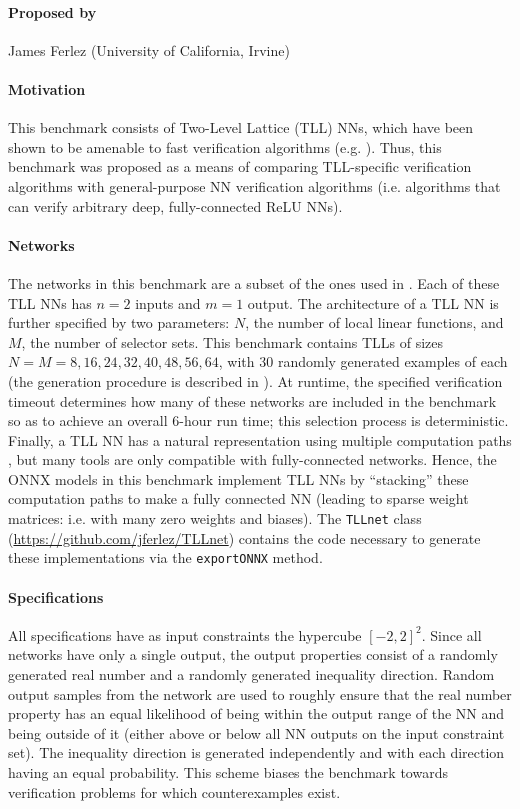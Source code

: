 \documentclass[oneside,11pt,dvipsnames]{book}
\begin{document}
\paragraph*{Proposed by} James Ferlez (University of California, Irvine)

\paragraph*{Motivation} This benchmark consists of Two-Level Lattice (TLL) NNs, which have been shown to be amenable to fast verification algorithms (e.g. \cite{FerlezKS22}). Thus, this benchmark was proposed as a means of comparing TLL-specific verification algorithms with general-purpose NN verification algorithms (i.e. algorithms that can verify arbitrary deep, fully-connected ReLU NNs).

\paragraph*{Networks}  The networks in this benchmark are a subset of the ones used in \cite[Experiment 3]{FerlezKS22}. Each of these TLL NNs has $n=2$ inputs and $m=1$ output. The architecture of a TLL NN is further specified by two parameters: $N$, the number of local linear functions, and $M$, the number of selector sets. This benchmark contains TLLs of sizes $N = M = 8, 16, 24, 32, 40, 48, 56, 64$, with $30$ randomly generated examples of each (the generation procedure is described in \cite[Section 6.1.1]{FerlezKS22}). At runtime, the specified verification timeout determines how many of these networks are included in the benchmark so as to achieve an overall 6-hour run time; this selection process is deterministic. Finally, a TLL NN has a natural representation using multiple computation paths \cite[Figure 1]{FerlezKS22}, but many tools are only compatible with fully-connected networks. Hence, the ONNX models in this benchmark implement TLL NNs by ``stacking'' these computation paths to make a fully connected NN (leading to sparse weight matrices: i.e. with many zero weights and biases). The \texttt{TLLnet} class (\url{https://github.com/jferlez/TLLnet}) contains the code necessary to generate these implementations via the \texttt{exportONNX} method.

\paragraph*{Specifications}  All specifications have as input constraints the hypercube $[-2,2]^2$. Since all networks have only a single output, the output properties consist of a randomly generated real number and a randomly generated inequality direction. Random output samples from the network are used to roughly ensure that the real number property has an equal likelihood of being within the output range of the NN and being outside of it (either above or below all NN outputs on the input constraint set). The inequality direction is generated independently and with each direction having an equal probability. This scheme biases the benchmark towards verification problems for which counterexamples exist. 
\end{document}
